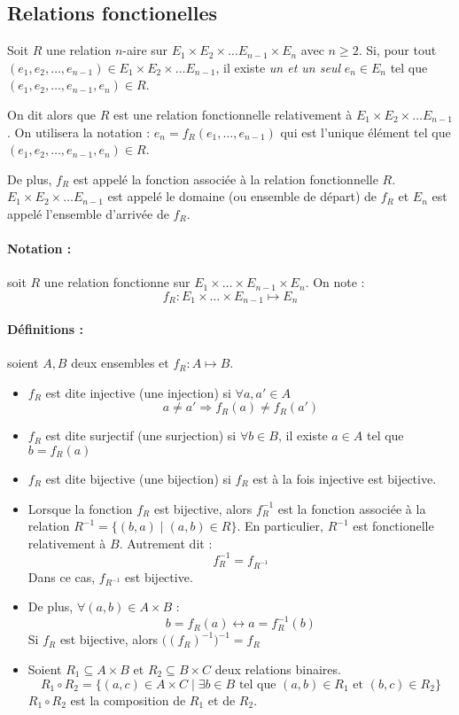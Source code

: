 \documentclass[12pt, a4paper]{report}
\begin{document}
\subsection{Relations fonctionelles}

Soit $R$ une relation $n$-aire sur $E_1\times E_2\times\dots E_{n-1}\times E_n$ avec $n\geq 2$. Si, pour tout $(e_1,e_2,\dots,e_{n-1})\in E_1\times E_2\times\dots E_{n-1}$, il existe \textit{un et un seul} $e_n\in E_n$ tel que $(e_1,e_2,\dots,e_{n-1},e_n) \in R$.

On dit alors que $R$ est une relation fonctionnelle relativement à $E_1\times E_2\times\dots E_{n-1}$. On utilisera la notation : $e_n = f_R(e_1,\dots,e_{n-1})$ qui est l'unique élément tel que $(e_1,e_2,\dots,e_{n-1},e_n)\in R$.

De plus, $f_R$ est appelé la fonction associée à la relation fonctionnelle $R$. $E_1\times E_2\times\dots E_{n-1}$ est appelé le domaine (ou ensemble de départ) de $f_R$ et $E_n$ est appelé l'ensemble d'arrivée de $f_R$.

\paragraph{Notation :} soit $R$ une relation fonctionne sur $E_1\times\dots\times E_{n-1}\times E_n$. On note :
\[
f_R : E_1\times\dots\times E_{n-1} \longmapsto E_n
\]

\paragraph{Définitions :} soient $A, B$ deux ensembles et $f_R : A\mapsto B$.

\begin{itemize}
\item $f_R$ est dite injective (une injection) si $\forall a, a' \in A$
\[a\neq a' \Rightarrow f_R(a) \neq f_R(a')\]

\item $f_R$ est dite surjectif (une surjection) si $\forall b\in B$, il existe $a\in A$ tel que $b = f_R(a)$

\item $f_R$ est dite bijective (une bijection) si $f_R$ est à la fois injective est bijective.

\item Lorsque la fonction $f_R$ est bijective, alors $f_R^{-1}$ est la fonction associée à la relation $R^{-1} = \{(b,a) \mid (a,b) \in R\}$. En particulier, $R^{-1}$ est fonctionelle relativement à $B$. Autrement dit :
\[f_R^{-1} = f_{R^{-1}}\]
Dans ce cas, $f_{R^{-1}}$ est bijective.

\item De plus, $\forall (a, b) \in A\times B$ : 
\[b=f_R(a) \leftrightarrow a = f_R^{-1}(b)\]
Si $f_R$ est bijective, alors $\big((f_R)^{-1}\big)^{-1} = f_R$

\item Soient $R_1 \subseteq A\times B$ et $R_2 \subseteq B\times C$ deux relations binaires.
\[R_1 \circ R_2 = \{(a,c) \in A \times C \mid \exists b\in B \text{ tel que }(a,b)\in R_1 \text{ et } (b,c)\in R_2\} \]
$R_1 \circ R_2$ est la composition de $R_1$ et de $R_2$.
\end{itemize}
\end{document}
